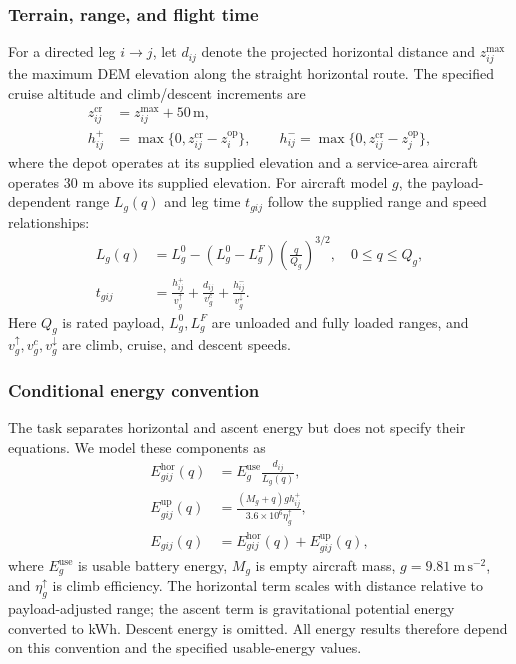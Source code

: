\documentclass[11pt,a4paper]{article}
\newcommand{\Ehor}{E^{\mathrm{hor}}}
\newcommand{\Eup}{E^{\mathrm{up}}}
\newcommand{\m}{\,\mathrm{m}}
\begin{document}
\subsubsection{Terrain, range, and flight time}
For a directed leg $i\to j$, let $d_{ij}$ denote the projected horizontal distance and $z^{\max}_{ij}$ the maximum DEM elevation along the straight horizontal route. The specified cruise altitude and climb/descent increments are
\begin{align}
z^{\mathrm{cr}}_{ij}&=z^{\max}_{ij}+50\m,\\
h^+_{ij}&=\max\{0,z^{\mathrm{cr}}_{ij}-z_i^{\mathrm{op}}\},\qquad
h^-_{ij}=\max\{0,z^{\mathrm{cr}}_{ij}-z_j^{\mathrm{op}}\},
\end{align}
where the depot operates at its supplied elevation and a service-area aircraft operates 30 m above its supplied elevation. For aircraft model $g$, the payload-dependent range $L_g(q)$ and leg time $t_{gij}$ follow the supplied range and speed relationships:
\begin{align}
L_g(q)&=L_g^0-(L_g^0-L_g^F)\left(\frac{q}{Q_g}\right)^{3/2},\quad 0\le q\le Q_g,\label{eq:range}\\
t_{gij}&=\frac{h^+_{ij}}{v_g^\uparrow}+\frac{d_{ij}}{v_g^c}+\frac{h^-_{ij}}{v_g^\downarrow}.\label{eq:time}
\end{align}
Here $Q_g$ is rated payload, $L_g^0,L_g^F$ are unloaded and fully loaded ranges, and $v_g^\uparrow,v_g^c,v_g^\downarrow$ are climb, cruise, and descent speeds.

\subsubsection{Conditional energy convention}
The task separates horizontal and ascent energy but does not specify their equations. We model these components as
\begin{align}
\Ehor_{gij}(q)&=E_g^{\mathrm{use}}\frac{d_{ij}}{L_g(q)},\\
\Eup_{gij}(q)&=\frac{(M_g+q)g h^+_{ij}}{3.6\times10^6\eta_g^\uparrow},\\
E_{gij}(q)&=\Ehor_{gij}(q)+\Eup_{gij}(q),
\label{eq:energy}
\end{align}
where $E_g^{\mathrm{use}}$ is usable battery energy, $M_g$ is empty aircraft mass, $g=9.81\ \mathrm{m\,s^{-2}}$, and $\eta_g^\uparrow$ is climb efficiency. The horizontal term scales with distance relative to payload-adjusted range; the ascent term is gravitational potential energy converted to kWh. Descent energy is omitted. All energy results therefore depend on this convention and the specified usable-energy values.
\end{document}
